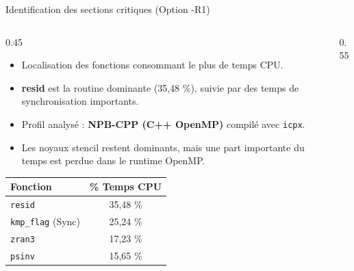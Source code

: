 \begin{frame}{Identification des sections critiques (Option -R1)}
    \begin{columns}[T]
        \begin{column}{0.45\textwidth}
            \begin{itemize}
                \fontsize{8}{9}\selectfont
                \item Localisation des fonctions consommant le plus de temps CPU.
                \item \textbf{resid} est la routine dominante (35,48 \%), suivie par des temps de synchronisation importants.
                \item Profil analysé : \textbf{NPB-CPP (C++ OpenMP)} compilé avec \texttt{icpx}.
                \item Les noyaux stencil restent dominants, mais une part importante du temps est perdue dans le runtime OpenMP.
            \end{itemize}
            \vspace{0.1cm}
            \begin{table}
                \fontsize{6}{7}\selectfont
                \centering
                \begin{tabular}{|l|c|}
                    \hline
                    \textbf{Fonction} & \textbf{\% Temps CPU} \\ \hline
                    \texttt{resid}    & 35,48 \% \\ \hline
                    \texttt{kmp\_flag} (Sync) & 25,24 \% \\ \hline
                    \texttt{zran3}    & 17,23 \% \\ \hline
                    \texttt{psinv}    & 15,65 \% \\ \hline
                \end{tabular}
            \end{table}
        \end{column}
        \begin{column}{0.55\textwidth}
            \vspace{-0.4cm}
        \end{column}
    \end{columns}
\end{frame}

